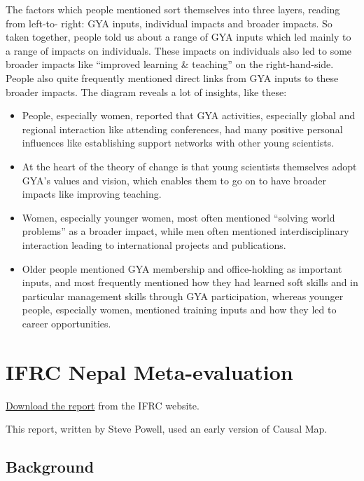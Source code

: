 \documentclass[
]{book}
\begin{document}
The factors which people mentioned sort themselves into three layers, reading from left-to-
right: GYA inputs, individual impacts and broader impacts. So taken together, people told
us about a range of GYA inputs which led mainly to a range of impacts on individuals. These
impacts on individuals also led to some broader impacts like ``improved learning \&
teaching'' on the right-hand-side. People also quite frequently mentioned direct links from
GYA inputs to these broader impacts. The diagram reveals a lot of insights, like these:

\begin{itemize}
\item
  People, especially women, reported that GYA activities, especially global and regional
  interaction like attending conferences, had many positive personal influences like
  establishing support networks with other young scientists.
\item
  At the heart of the theory of change is that young scientists themselves adopt GYA's
  values and vision, which enables them to go on to have broader impacts like improving
  teaching.
\item
  Women, especially younger women, most often mentioned ``solving world problems''
  as a broader impact, while men often mentioned interdisciplinary interaction leading
  to international projects and publications.
\item
  Older people mentioned GYA membership and office-holding as important inputs, and
  most frequently mentioned how they had learned soft skills and in particular
  management skills through GYA participation, whereas younger people, especially
  women, mentioned training inputs and how they led to career opportunities.
\end{itemize}

\hypertarget{ifrc-nepal-meta-evaluation}{%
\section{IFRC Nepal Meta-evaluation}\label{ifrc-nepal-meta-evaluation}}

\href{http://adore.ifrc.org/Download.aspx?FileId=313302}{Download the report} from the IFRC website.

This report, written by Steve Powell, used an early version of Causal Map.

\hypertarget{background}{%
\subsection{Background}\label{background}}
\end{document}
